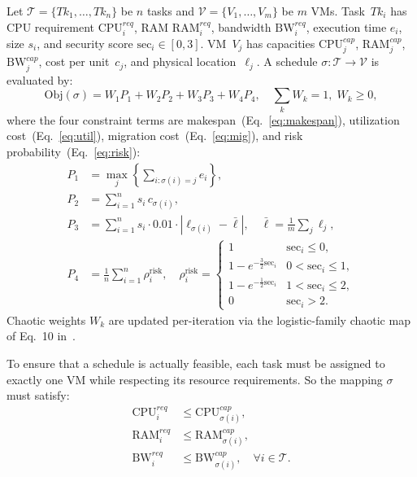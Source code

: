 \documentclass[journal]{IEEEtran}
\begin{document}
Let $\mathcal{T}=\{Tk_1,\ldots,Tk_n\}$ be $n$ tasks and
$\mathcal{V}=\{V_1,\ldots,V_m\}$ be $m$ VMs. Task~$Tk_i$ has CPU requirement
$\mathrm{CPU}^{req}_i$, RAM $\mathrm{RAM}^{req}_i$, bandwidth $\mathrm{BW}^{req}_i$,
execution time $e_i$, size $s_i$, and security score $\mathrm{sec}_i\!\in[0,3]$. VM~$V_j$
has capacities $\mathrm{CPU}^{cap}_j$, $\mathrm{RAM}^{cap}_j$, $\mathrm{BW}^{cap}_j$,
cost per unit~$c_j$, and physical location~$\ell_j$. A schedule
$\sigma\colon\mathcal{T}\to\mathcal{V}$ is evaluated by:
\begin{equation}
  \mathrm{Obj}(\sigma)=W_1P_1+W_2P_2+W_3P_3+W_4P_4,\quad
  \textstyle\sum_kW_k=1,\;W_k\ge0,
  \label{eq:obj}
\end{equation}
where the four constraint terms are makespan~(Eq.~\ref{eq:makespan}),
utilization cost~(Eq.~\ref{eq:util}), migration cost~(Eq.~\ref{eq:mig}), and risk
probability~(Eq.~\ref{eq:risk}):
\begin{align}
  P_1&=\max_{j}\left\{\sum_{i:\sigma(i)=j}e_i\right\},\label{eq:makespan}\\
  P_2&=\sum_{i=1}^{n}s_i\,c_{\sigma(i)},\label{eq:util}\\
  P_3&=\sum_{i=1}^{n}s_i\cdot0.01\cdot|\ell_{\sigma(i)}-\bar{\ell}|,
       \quad\bar{\ell}=\tfrac{1}{m}\textstyle\sum_j\ell_j,\label{eq:mig}\\
  P_4&=\tfrac{1}{n}\textstyle\sum_{i=1}^{n}\rho^{\mathrm{risk}}_i,\quad
  \rho^{\mathrm{risk}}_i=
  \begin{cases}
    1                      & \mathrm{sec}_i\le0,\\
    1-e^{-\frac{3}{2}\mathrm{sec}_i} & 0<\mathrm{sec}_i\le1,\\
    1-e^{-\frac{1}{2}\mathrm{sec}_i} & 1<\mathrm{sec}_i\le2,\\
    0                      & \mathrm{sec}_i>2.
  \end{cases}\label{eq:risk}
\end{align}
Chaotic weights $W_k$ are updated per-iteration via the logistic-family chaotic map of
Eq.~10 in~\cite{pachipala2024}.

To ensure that a schedule is actually feasible, each task must be assigned to exactly one VM while respecting its resource requirements. So the mapping $\sigma$ must satisfy:
\begin{align}
\mathrm{CPU}^{req}_i &\le \mathrm{CPU}^{cap}_{\sigma(i)}, \\
\mathrm{RAM}^{req}_i &\le \mathrm{RAM}^{cap}_{\sigma(i)}, \\
\mathrm{BW}^{req}_i  &\le \mathrm{BW}^{cap}_{\sigma(i)}, \quad \forall i \in \mathcal{T}.
\end{align}
\end{document}
